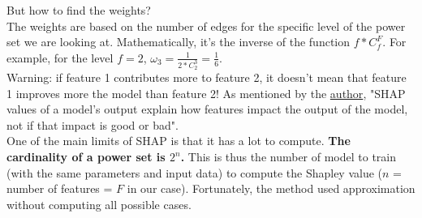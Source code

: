 But how to find the weights? \\

The weights are based on the number of edges for the specific level of the power set we are looking at. Mathematically, it's the inverse of the function $f*C_f^F$. For example, for the level $f=2$, $\omega_3 = \frac{1}{2*C_2^3} = \frac{1}{6}$. \\

Warning: if feature 1 contributes more to feature 2, it doesn't mean that feature 1 improves more the model than feature 2! As mentioned by the \href{https://github.com/slundberg/shap/issues/367}{author}, "SHAP values of a model's output explain how features impact the output of the model, not if that impact is good or bad".\\

One of the main limits of SHAP is that it has a lot to compute. \textbf{The cardinality of a power set is $2^n$.} This is thus the number of model to train (with the same parameters and input data) to compute the Shapley value ($n$ = number of features = $F$ in our case). Fortunately, the method used approximation without computing all possible cases. \\

\vspace{5mm}